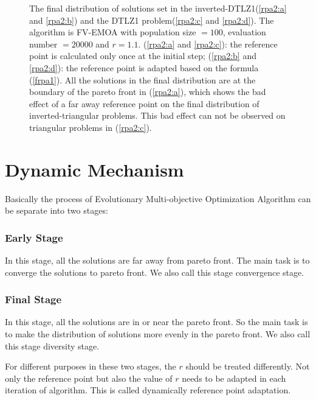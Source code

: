 \documentclass[conference]{IEEEtran}
\begin{document}
\begin{figure}[!t]
  \caption{The final distribution of solutions set in the inverted-DTLZ1(\ref{rpa2:a} and \ref{rpa2:b}) 
  and the DTLZ1 problem(\ref{rpa2:c} and \ref{rpa2:d}).
  The algorithm is FV-EMOA with population size $= 100$, evaluation number $= 20000$ and $r=1.1$. 
  (\ref{rpa2:a} and \ref{rpa2:c}): the reference point is calculated only once at the initial step;
  (\ref{rpa2:b} and \ref{rpa2:d}): the reference point is adapted based on the formula (\ref{frpa1}).
  All the solutions in the final distribution are at the boundary of the pareto front in (\ref{rpa2:a}),
  which shows the bad effect of a far away reference point
  on the final distribution of inverted-triangular problems.
  This bad effect can not be observed on triangular problems in (\ref{rpa2:c}).
  }
  \label{rpa2}
\end{figure}

%
% 
\section{Dynamic Mechanism}
Basically the process of Evolutionary Multi-objective Optimization Algorithm can be separate into
two stages:
\subsubsection{Early Stage} In this stage, 
all the solutions are far away from pareto front.
The main task is to converge the solutions to pareto front.
We also call this stage convergence stage.
\subsubsection{Final Stage} In this stage,
all the solutions are in or near the pareto front.
So the main task is to make the distribution of solutions more evenly in the pareto front.
We also call this stage diversity stage.

For different purposes in these two stages, the $r$ should be treated differently\cite{ut}. 
Not only the reference point but also the value of $r$ 
needs to be adapted in each iteration of algorithm. 
This is called dynamically reference point adaptation. 
\end{document}

